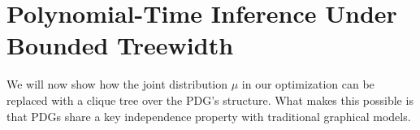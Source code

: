 \documentclass{article}
\begin{document}


\section{Polynomial-Time Inference \hphantom{Under Bounded} Under Bounded Treewidth}
    \label{sec:clique-tree-expcone}

We will now show how the joint distribution $\mu$ in our optimization can be replaced
with a clique tree over the PDG's structure. What makes this possible is that
PDGs share a key independence property with traditional graphical models.
\end{document}
